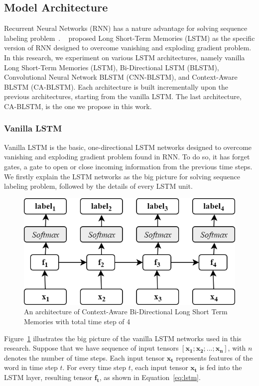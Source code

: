 \subsection{Model Architecture}
Recurrent Neural Networks (RNN) has a nature advantage for solving sequence labeling problem~\cite{zhou2015end}. ~\cite{hochreiter1997long} proposed Long Short-Term Memories (LSTM) as the specific version of RNN designed to overcome vanishing and exploding gradient problem. In this research, we experiment on various LSTM architectures, namely vanilla Long Short-Term Memories (LSTM), Bi-Directional LSTM (BLSTM), Convolutional Neural Network BLSTM (CNN-BLSTM), and Context-Aware BLSTM (CA-BLSTM). Each architecture is built incrementally upon the previous architectures, starting from the vanilla LSTM. The last architecture, CA-BLSTM, is the one we propose in this work.

\subsubsection{Vanilla LSTM}
Vanilla LSTM is the basic, one-directional LSTM networks designed to overcome vanishing and exploding gradient problem found in RNN. To do so, it has forget gates, a gate to open or close incoming information from the previous time steps. We firstly explain the LSTM networks as the big picture for solving sequence labeling problem, followed by the details of every LSTM unit. 

\begin{figure}
	\centering
	\includegraphics[width=0.75\linewidth]{images/olstm}
	\caption{An architecture of Context-Aware Bi-Directional Long Short Term Memories with total time step of 4}
	\label{fig:olstm}
\end{figure}

Figure~\ref{fig:olstm} illustrates the big picture of the vanilla LSTM networks used in this research. Suppose that we have sequence of input tensors $[\mathbf{x_{1}}; \mathbf{x_{2}}; ...; \mathbf{x_{n}}]$, with $n$ denotes the number of time steps. Each input tensor $\mathbf{x_{t}}$ represents features of the word in time step $t$. For every time step $t$, each input tensor $\mathbf{x_{t}}$ is fed into the LSTM layer, resulting tensor $\mathbf{f_{t}}$, as shown in Equation~\ref{eq:lstm}. 

